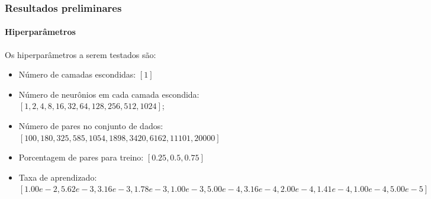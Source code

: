 \documentclass[aspectratio=169]{beamer}
\begin{document}
\begin{frame}
\frametitle{Resultados preliminares}
\framesubtitle{Hiperparâmetros}

Os hiperparâmetros a serem testados são:
\begin{itemize}
    \item Número de camadas escondidas: $ [1] $ 
    \item Número de neurônios em cada camada escondida: $[1, 2, 4, 8, 16, 32, 64, 128, 256, 512, 1024]$;
    \item Número de pares no conjunto de dados: $[100, 180, 325, 585, 1054, 1898, 3420, 6162, 11101, 20000]$
    \item Porcentagem de pares para treino: $[0.25, 0.5, 0.75]$
    \item Taxa de aprendizado: $[1.00e-2, 5.62e-3, 3.16e-3, 1.78e-3, 1.00e-3, 5.00e-4, 3.16e-4, 2.00e-4, 1.41e-4, 1.00e-4, 5.00e-5]$
\end{itemize}

\end{frame}
\end{document}
